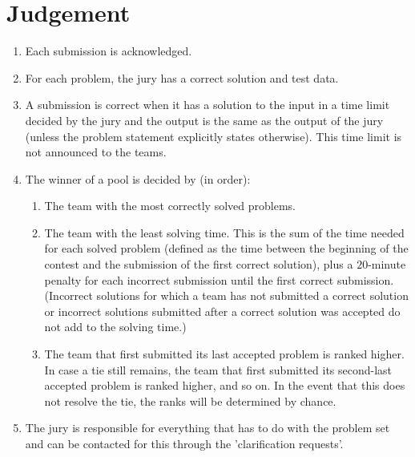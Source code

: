 \documentclass[11pt]{report}
\begin{document}
\section{Judgement}
\begin{enumerate}[label=\bfseries 4.6.\arabic*]
\item Each submission is acknowledged.
\item For each problem, the jury has a correct solution and test data.
\item A submission is correct when it has a solution to the input in a time limit decided by the jury and the output is the same as the output of the jury (unless the problem statement explicitly states otherwise). This time limit is not announced to the teams.
\item The winner of a pool is decided by (in order):
	\begin{enumerate}
	\item The team with the most correctly solved problems.
	\item The team with the least solving time. This is the sum of the time needed for each solved problem (defined as the time between the beginning of the contest and the submission of the first correct solution), plus a $20$-minute penalty for each incorrect submission until the first correct submission. (Incorrect solutions for which a team has not submitted a correct solution or incorrect solutions submitted after a correct solution was accepted do not add to the solving time.)
	\item The team that first submitted its last accepted problem is ranked higher. In case a tie still remains, the team that first submitted its second-last accepted problem is ranked higher, and so on. In the event that this does not resolve the tie, the ranks will be determined by chance.
	\end{enumerate} 
\item The jury is responsible for everything that has to do with the problem set and can be contacted for this through the 'clarification requests'.
\end{enumerate}
\end{document}
